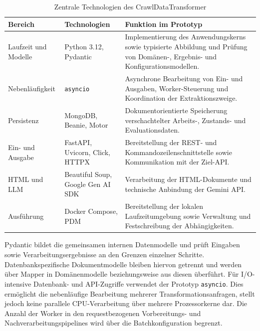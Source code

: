 \begin{table}[H]
    \centering
    \begingroup
    \small
    \setlength{\tabcolsep}{5pt}
    \renewcommand{\arraystretch}{1.16}
    \begin{tabularx}{\textwidth}{
        @{}
        >{\raggedright\arraybackslash}p{}
        >{\raggedright\arraybackslash}p{}
        >{\raggedright\arraybackslash}X
        @{}
    }
        \toprule
        \textbf{Bereich}
        & \textbf{Technologien}
        & \textbf{Funktion im Prototyp} \\
        \midrule

        Laufzeit und Modelle
        & Python 3.12, Pydantic
        & Implementierung des Anwendungskerns sowie typisierte Abbildung und Prüfung von Domänen-, Ergebnis- und Konfigurationsmodellen. \\
        \addlinespace[2pt]

        Nebenläufigkeit
        & \texttt{asyncio}
        & Asynchrone Bearbeitung von Ein- und Ausgaben, Worker-Steuerung und Koordination der Extraktionszweige. \\
        \addlinespace[2pt]

        Persistenz
        & MongoDB, Beanie, Motor
        & Dokumentorientierte Speicherung verschachtelter Arbeits-, Zustands- und Evaluationsdaten. \\
        \addlinespace[2pt]

        Ein- und Ausgabe
        & FastAPI, Uvicorn, Click, HTTPX
        & Bereitstellung der REST- und Kommandozeilenschnittstelle sowie Kommunikation mit der Ziel-API. \\
        \addlinespace[2pt]

        HTML und LLM
        & Beautiful Soup, Google Gen AI SDK
        & Verarbeitung der HTML-Dokumente und technische Anbindung der Gemini API. \\
        \addlinespace[2pt]

        Ausführung
        & Docker Compose, PDM
        & Bereitstellung der lokalen Laufzeitumgebung sowie Verwaltung und Festschreibung der Abhängigkeiten. \\

        \bottomrule
    \end{tabularx}
    \caption{Zentrale Technologien des CrawlDataTransformer}
    \label{tab:technologien-implementierung}
    \endgroup
\end{table}

Pydantic bildet die gemeinsamen internen Datenmodelle und prüft Eingaben sowie Verarbeitungsergebnisse an den Grenzen einzelner Schritte. Datenbankspezifische 
Dokumentmodelle bleiben hiervon getrennt und werden über Mapper in Domänenmodelle beziehungsweise aus diesen überführt. Für I/O-intensive Datenbank- und API-Zugriffe 
verwendet der Prototyp \texttt{asyncio}. Dies ermöglicht die nebenläufige Bearbeitung mehrerer Transformationsanfragen, stellt jedoch keine parallele CPU-Verarbeitung 
über mehrere Prozessorkerne dar. Die Anzahl der Worker in den requestbezogenen Vorbereitungs- und Nachverarbeitungspipelines wird über die Batchkonfiguration begrenzt.

